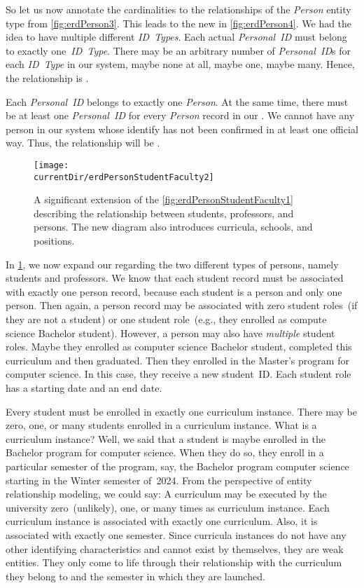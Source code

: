 So let us now annotate the cardinalities to the relationships of the \emph{Person} entity type from \cref{fig:erdPerson3}.
This leads to the new  in \cref{fig:erdPerson4}.
We had the idea to have multiple different \emph{ID~Types}.
Each actual \emph{Personal~ID} must belong to exactly one~\emph{ID~Type}.
There may be an arbitrary number of \emph{Personal~ID}s for each \emph{ID~Type} in our system, maybe none at all, maybe one, maybe many.
Hence, the relationship is .

Each \emph{Personal~ID} belongs to exactly one \emph{Person}.
At the same time, there must be at least one \emph{Personal~ID} for every \emph{Person} record in our \db.
We cannot have any person in our system whose identify has not been confirmed in at least one official way.
Thus, the relationship will be .

\begin{figure}%
\centering%
\texttt{[image: \\currentDir/erdPersonStudentFaculty2]}%
\caption{A significant extension of the \cref{fig:erdPersonStudentFaculty1}  describing the relationship between students, professors, and persons. %
The new diagram also introduces curricula, schools, and positions.}%
\label{fig:erdPersonStudentFaculty2}%
\end{figure}%

In \cref{fig:erdPersonStudentFaculty2}, we now expand our  regarding the two different types of persons, namely students and professors.
We know that each student record must be associated with exactly one person record, because each student is a person and only one person.
Then again, a person record may be associated with zero student roles~(if they are not a student) or one student role~(e.g., they enrolled as compute science Bachelor student).
However, a person may also have \emph{multiple} student roles.
Maybe they enrolled as computer science Bachelor student, completed this curriculum and then graduated.
Then they enrolled in the Master's program for computer science.
In this case, they receive a new student~ID.
Each student role has a starting date and an end date.

Every student must be enrolled in exactly one curriculum instance.
There may be zero, one, or many students enrolled in a curriculum instance.
What is a curriculum instance?
Well, we said that a student is maybe enrolled in the Bachelor program for computer science.
When they do so, they enroll in a particular semester of the program, say, the Bachelor program computer science starting in the Winter semester of~2024.
From the perspective of entity relationship modeling, we could say:
A curriculum may be executed by the university zero~(unlikely), one, or many times as curriculum instance.
Each curriculum instance is associated with exactly one curriculum.
Also, it is associated with exactly one semester.
Since curricula instances do not have any other identifying characteristics and cannot exist by themselves, they are weak entities.
They only come to life through their relationship with the curriculum they belong to and the semester in which they are launched.

